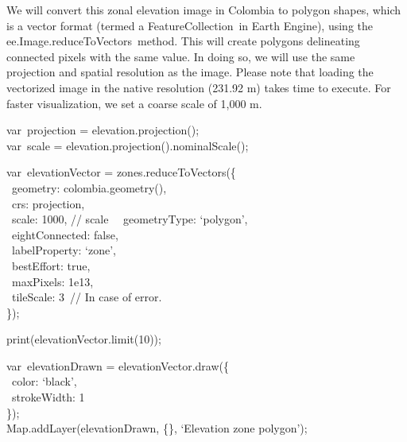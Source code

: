 \documentclass[
  letterpaper,
  DIV=11,
  numbers=noendperiod]{scrreprt}
\begin{document}
We will convert this zonal elevation image in Colombia to polygon
shapes, which is a vector format (termed a FeatureCollection~in Earth
Engine), using the ee.Image.reduceToVectors~method. This will create
polygons delineating connected pixels with the same value. In doing so,
we will use the same projection and spatial resolution as the image.
Please note that loading the vectorized image in the native resolution
(231.92 m) takes time to execute. For faster visualization, we set a
coarse scale of 1,000 m.

var~projection = elevation.projection();\\
var~scale = elevation.projection().nominalScale();

var~elevationVector = zones.reduceToVectors(\{\\
\hspace*{0.333em} ~geometry: colombia.geometry(),\\
\hspace*{0.333em} ~crs: projection,\\
\hspace*{0.333em} ~scale: 1000, // scale~ ~geometryType: `polygon',\\
\hspace*{0.333em} ~eightConnected: false,\\
\hspace*{0.333em} ~labelProperty: `zone',\\
\hspace*{0.333em} ~bestEffort: true,\\
\hspace*{0.333em} ~maxPixels: 1e13,\\
\hspace*{0.333em} ~tileScale: 3~// In case of error.\\
\});

print(elevationVector.limit(10));

var~elevationDrawn = elevationVector.draw(\{\\
\hspace*{0.333em} ~color: `black',\\
\hspace*{0.333em} ~strokeWidth: 1\\
\});\\
Map.addLayer(elevationDrawn, \{\}, `Elevation zone polygon');
\end{document}
